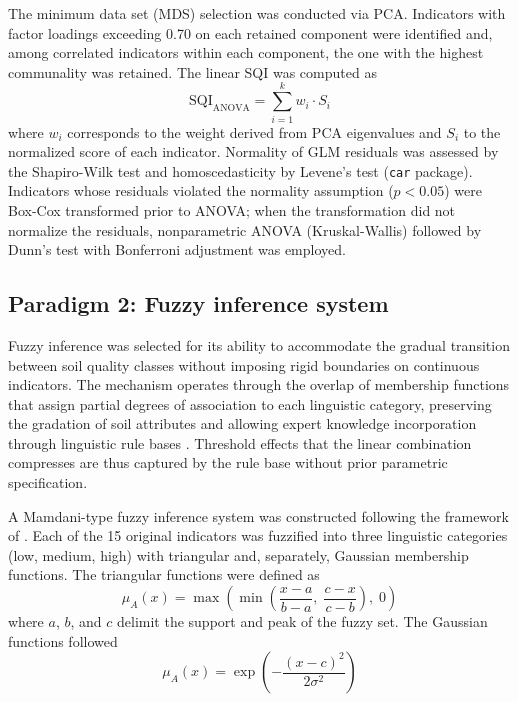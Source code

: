 \documentclass[pdflatex,sn-basic]{sn-jnl}%
\begin{document}
The minimum data set (MDS) selection was conducted via PCA. Indicators with factor loadings exceeding 0.70 on each retained component were identified and, among correlated indicators within each component, the one with the highest communality was retained. The linear SQI was computed as
\begin{equation}
\text{SQI}_{\text{ANOVA}} = \sum_{i=1}^{k} w_i \cdot S_i
\label{eq:sqi_anova}
\end{equation}
where $w_i$ corresponds to the weight derived from PCA eigenvalues and $S_i$ to the normalized score of each indicator. Normality of GLM residuals was assessed by the Shapiro-Wilk test and homoscedasticity by Levene's test (\texttt{car} package). Indicators whose residuals violated the normality assumption ($p < 0.05$) were Box-Cox transformed prior to ANOVA; when the transformation did not normalize the residuals, nonparametric ANOVA (Kruskal-Wallis) followed by Dunn's test with Bonferroni adjustment was employed.

\subsection{Paradigm 2: Fuzzy inference system}\label{subsec:fuzzy}

Fuzzy inference was selected for its ability to accommodate the gradual transition between soil quality classes without imposing rigid boundaries on continuous indicators. The mechanism operates through the overlap of membership functions that assign partial degrees of association to each linguistic category, preserving the gradation of soil attributes and allowing expert knowledge incorporation through linguistic rule bases \citep{Nabiollahi2018}. Threshold effects that the linear combination compresses are thus captured by the rule base without prior parametric specification.

A Mamdani-type fuzzy inference system \citep{Mamdani1975} was constructed following the framework of \cite{Torbert2008}. Each of the 15 original indicators was fuzzified into three linguistic categories (low, medium, high) with triangular and, separately, Gaussian membership functions. The triangular functions were defined as
\begin{equation}
\mu_A(x) = \max\left(\min\left(\frac{x-a}{b-a},\; \frac{c-x}{c-b}\right),\; 0\right)
\label{eq:trimf}
\end{equation}
where $a$, $b$, and $c$ delimit the support and peak of the fuzzy set. The Gaussian functions followed
\begin{equation}
\mu_A(x) = \exp\left(-\frac{(x-c)^2}{2\sigma^2}\right)
\label{eq:gaussmf}
\end{equation}
\end{document}

